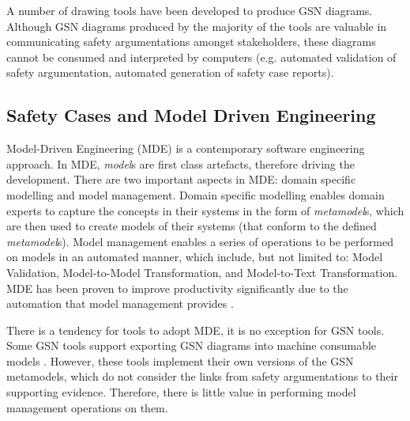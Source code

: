 A number of drawing tools have been developed \cite{denney2017tool, matsuno2010dependability, netkachova2014tool, larrucea2017supporting, yorkgsn, barry2011certware} to produce GSN diagrams. 
Although GSN diagrams produced by the majority of the tools are valuable in communicating safety argumentations amongst stakeholders, these diagrams cannot be consumed and interpreted by computers (e.g. automated validation of safety argumentation, automated generation of safety case reports). 


\subsection{Safety Cases and Model Driven Engineering}
Model-Driven Engineering (MDE) is a contemporary software engineering approach. 
In MDE, \textit{model}s are first class artefacts, therefore driving the development. 
There are two important aspects in MDE: domain specific modelling and model management. 
Domain specific modelling enables domain experts to capture the concepts in their systems in the form of \textit{metamodel}s, which are then used to create models of their systems (that conform to the defined \textit{metamodel}s). 
Model management enables a series of operations to be performed on models in an automated manner, which include, but not limited to: Model Validation, Model-to-Model Transformation, and Model-to-Text Transformation.
MDE has been proven to improve productivity significantly due to the automation that model management provides \cite{jaaksi2002developing, karna2009evaluating}. 

There is a tendency for tools to adopt MDE, it is no exception for GSN tools. 
Some GSN tools support exporting GSN diagrams into machine consumable models \cite{barry2011certware, larrucea2017supporting}.
However, these tools implement their own versions of the GSN metamodels, which do not consider the links from safety argumentations to their supporting evidence. 
Therefore, there is little value in performing model management operations on them.


%

